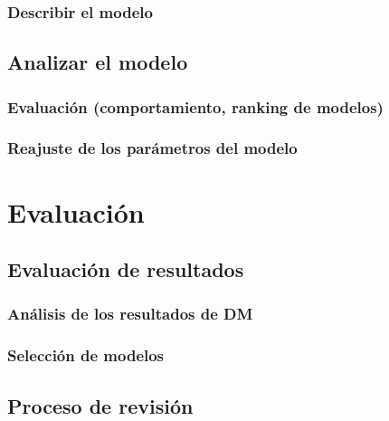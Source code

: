 \documentclass[11pt,a4paper,twoside]{tesis}
\begin{document}
\subsection{Describir el modelo}
\section{Analizar el modelo}
\subsection{Evaluación (comportamiento, ranking de modelos)}
\subsection{Reajuste de los parámetros del modelo}

\chapter{Evaluación}
\section{Evaluación de resultados}
\subsection{Análisis de los resultados de DM}
\subsection{Selección de modelos}
\section{Proceso de revisión}
\end{document}
